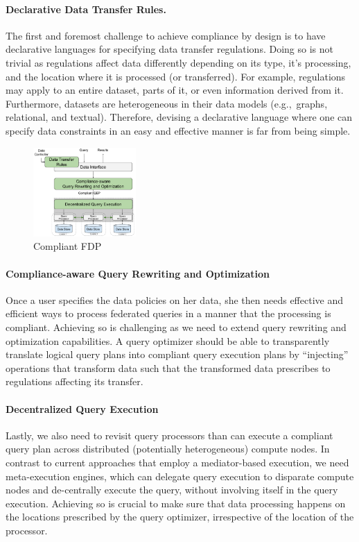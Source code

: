 \documentclass[11pt]{article}
\begin{document}
\paragraph{Declarative Data Transfer Rules.}
The first and foremost challenge to achieve compliance by
design is to have declarative languages for specifying data
transfer regulations. Doing so is not trivial as regulations
affect data differently depending on its type, it's
processing, and the location where it is processed (or
transferred). For example, regulations may apply to an
entire dataset, parts of it, or even information derived
from it. Furthermore, datasets are heterogeneous in their
data models (e.g.,~graphs, relational, and textual).
Therefore, devising a declarative language where one can
specify data constraints in an easy and effective manner is
far from being simple.


\begin{figure}
\centering
\includegraphics[width=0.35\textwidth]{figs/cbd.pdf}
\caption{Compliant FDP}
\label{fig:cbd}
\end{figure}

\paragraph{Compliance-aware Query Rewriting and
Optimization} Once a user specifies the data policies on her
data, she then needs effective and efficient ways to process
federated queries in a manner that the processing is
compliant. Achieving so is challenging as we need to extend
query rewriting and optimization capabilities. A query
optimizer should be able to transparently translate logical
query plans into compliant query execution plans by
``injecting'' operations that transform data such that the
transformed data prescribes to regulations affecting its
transfer.


\paragraph{Decentralized Query Execution} Lastly, we also
need to revisit query processors than can execute a
compliant query plan across distributed (potentially
heterogeneous) compute nodes. In contrast to current
approaches that employ a mediator-based execution, we need
meta-execution engines, which can delegate query execution
to disparate compute nodes and de-centrally execute the
query, without involving itself in the query execution.
Achieving so is crucial to make sure that data processing
happens on the locations prescribed by the query optimizer,
irrespective of the location of the processor.
\end{document}
